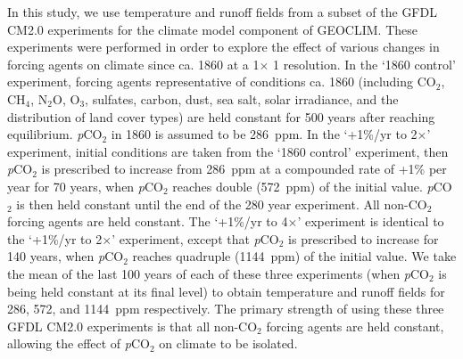 \documentclass[11pt,letterpaper]{article}
\newcommand{\degrees}{\textdegree\xspace}
\newcommand{\pCOtwo}{\textit{p}CO$_{2}$\xspace}
\newcommand{\COtwo}{CO$_{2}$\xspace}
\begin{document}
In this study, we use temperature and runoff fields from a subset of the GFDL CM2.0 experiments \citep{Delworth2006a, Delworth2006b} for the climate model component of GEOCLIM. These experiments were performed in order to explore the effect of various changes in forcing agents on climate since ca. 1860 at a 1\degrees $\times$ 1\degrees resolution. In the `1860 control' experiment, forcing agents representative of conditions ca. 1860 (including \COtwo, CH$_{4}$, N$_{2}$O, O$_{3}$, sulfates, carbon, dust, sea salt, solar irradiance, and the distribution of land cover types) are held constant for 500 years after reaching equilibrium. \pCOtwo in 1860 is assumed to be 286~ppm. In the `+1\%/yr to 2$\times$' experiment, initial conditions are taken from the `1860 control' experiment, then \pCOtwo is prescribed to increase from 286~ppm at a compounded rate of +1\% per year for 70 years, when \pCOtwo reaches double (572~ppm) of the initial value. \pCOtwo is then held constant until the end of the 280 year experiment. All non-\COtwo forcing agents are held constant. The `+1\%/yr to 4$\times$' experiment is identical to the `+1\%/yr to 2$\times$' experiment, except that \pCOtwo is prescribed to increase for 140 years, when \pCOtwo reaches quadruple (1144~ppm) of the initial value. We take the mean of the last 100 years of each of these three experiments (when \pCOtwo is being held constant at its final level) to obtain temperature and runoff fields for 286, 572, and 1144~ppm respectively. The primary strength of using these three GFDL CM2.0 experiments is that all non-\COtwo forcing agents are held constant, allowing the effect of \pCOtwo on climate to be isolated.
\end{document}
